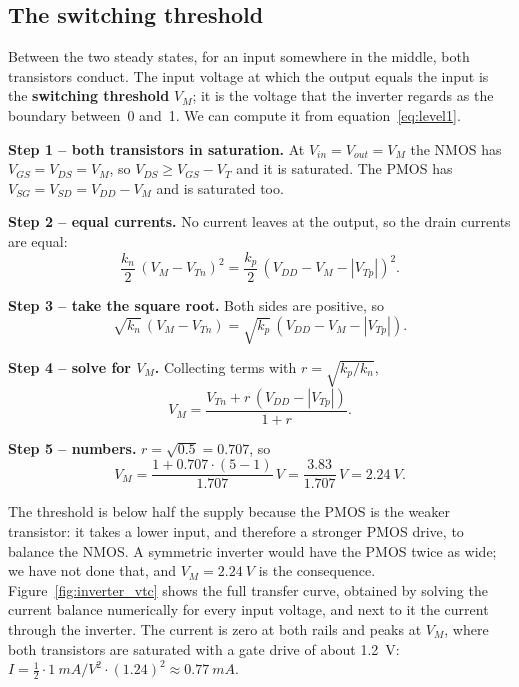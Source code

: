 \documentclass[11pt,a4paper]{article}
\newcommand{\VDD}{V_{DD}}
\newcommand{\VT}{V_{T}}
\begin{document}
\subsection{The switching threshold}

Between the two steady states, for an input somewhere in the middle,
both transistors conduct. The input voltage at which the output equals
the input is the \textbf{switching threshold} $V_M$; it is the voltage
that the inverter regards as the boundary between~0 and~1. We can
compute it from equation~\eqref{eq:level1}.

\begin{rechnung}
\textbf{Step 1 -- both transistors in saturation.} At $V_{in}=V_{out}=V_M$
the NMOS has $V_{GS}=V_{DS}=V_M$, so $V_{DS}\ge V_{GS}-\VT$ and it is
saturated. The PMOS has $V_{SG}=V_{SD}=\VDD-V_M$ and is saturated too.

\textbf{Step 2 -- equal currents.} No current leaves at the output, so
the drain currents are equal:
\begin{equation*}
    \frac{k_n}{2}\,(V_M - V_{Tn})^2 = \frac{k_p}{2}\,(\VDD - V_M - |V_{Tp}|)^2 .
\end{equation*}

\textbf{Step 3 -- take the square root.} Both sides are positive, so
\begin{equation*}
    \sqrt{k_n}\,(V_M - V_{Tn}) = \sqrt{k_p}\,(\VDD - V_M - |V_{Tp}|).
\end{equation*}

\textbf{Step 4 -- solve for $V_M$.} Collecting terms with
$r=\sqrt{k_p/k_n}$,
\begin{equation}
    V_M = \frac{V_{Tn} + r\,(\VDD - |V_{Tp}|)}{1 + r}.
    \label{eq:vm}
\end{equation}

\textbf{Step 5 -- numbers.} $r=\sqrt{0.5}=0.707$, so
\begin{equation*}
    V_M = \frac{1 + 0.707\cdot(5-1)}{1.707}\,\si{V} = \frac{3.83}{1.707}\,\si{V}
        = \SI{2.24}{V}.
\end{equation*}
\end{rechnung}

The threshold is below half the supply because the PMOS is the weaker
transistor: it takes a lower input, and therefore a stronger PMOS
drive, to balance the NMOS. A symmetric inverter would have the PMOS
twice as wide; we have not done that, and $V_M=\SI{2.24}{V}$ is the
consequence. Figure~\ref{fig:inverter_vtc} shows the full transfer
curve, obtained by solving the current balance numerically for every
input voltage, and next to it the current through the inverter. The
current is zero at both rails and peaks at $V_M$, where both
transistors are saturated with a gate drive of about \SI{1.2}{V}:
$I=\tfrac12\cdot\SI{1}{mA/V^2}\cdot(1.24)^2\approx\SI{0.77}{mA}$.
\end{document}
